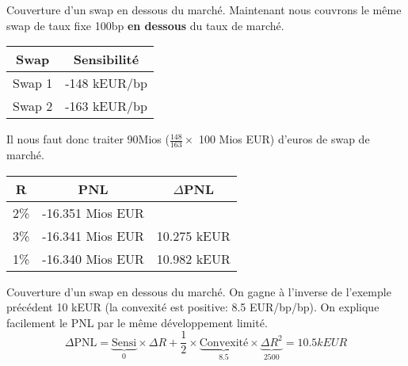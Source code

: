 \documentclass{beamer}
\begin{document}
\begin{frame}{Couverture d'un swap en dessous du marché.}
Maintenant nous couvrons le même swap de taux fixe 100bp \textbf{en dessous} du taux de marché.\\
\begin{center}
\begin{tabular}{|c|c|}
\hline
Swap&Sensibilité \\ 
\hline
Swap 1 &-148 kEUR/bp \\ 
Swap 2 &-163 kEUR/bp \\ 
\hline
\end{tabular}
\end{center}
Il nous faut donc traiter 90Mios ($\frac{148}{163} \times$ 100 Mios EUR)  d'euros de swap de marché. 
\begin{center}
\begin{tabular}{|c|c|c|}
\hline
R&PNL&$\Delta$PNL \\ 
\hline
2\% &-16.351 Mios EUR& \\ 
3\% &-16.341 Mios EUR&10.275 kEUR\\ 
1\% &-16.340 Mios EUR&10.982 kEUR\\ 
\hline
\end{tabular}
\end{center}
\end{frame}
\begin{frame}{Couverture d'un swap en dessous du marché.}
On gagne à l'inverse de l'exemple précédent 10 kEUR (la convexité est positive: 8.5 EUR/bp/bp).
On explique facilement le PNL par le même développement limité.
\[
\Delta \text{PNL}=\underbrace{\text{Sensi}}_{0} \times \Delta R + \frac{1}{2} \times \underbrace{\text{Convexité}}_{8.5} \times \underbrace{\Delta R^2}_{2500}=10.5 kEUR
\]
\end{frame}
\end{document}
